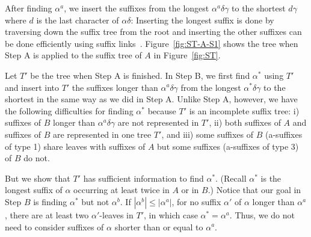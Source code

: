 \documentclass{llncs}
\newcommand{\partitle}[1]{}                        \newcommand{\commentout}[1]{}
\begin{document}
After finding $\alpha^{a}$,
 we insert the suffixes from the longest $\alpha^{a}\delta \gamma$
 to the shortest $d\gamma$ where $d$ is the last character of $\alpha\delta$:
Inserting the longest suffix is done by traversing down the suffix tree from the root
 and inserting the other suffixes can be done efficiently
 using suffix links~\cite{McCreight:76,Ukkonen:95}.
Figure~\ref{fig:ST-A-S1} shows the tree when Step A is applied to
the suffix tree of $A$ in Figure~\ref{fig:ST}.



\partitle{Step B}

Let $T'$ be the tree when Step A is finished.
In Step B, we first find $\alpha^{*}$ using $T'$
 and insert into $T'$ the suffixes longer than $\alpha^{a}\delta\gamma$
 from the longest $\alpha^{*}\delta \gamma$ to the shortest
 in the same way as we did in Step A.
Unlike Step A, however,
 we have the following difficulties for finding $\alpha^{*}$
 because $T'$ is an incomplete suffix tree:
 i) suffixes of $B$ longer than $\alpha^{a}\delta\gamma$ are not represented in $T'$,
 ii) both suffixes of $A$ and suffixes of $B$ are represented in one tree $T'$, and
 iii) some suffixes of $B$ (a-suffixes of type 1)
     share leaves with suffixes of $A$
     but some suffixes (a-suffixes of type 3) of $B$ do not.


But we show that $T'$ has sufficient information to find $\alpha^{*}$.
(Recall $\alpha^{*}$ is the longest suffix of $\alpha$
 occurring at least twice in $A$ or in $B$.)
Notice that our goal in Step $B$ is finding $\alpha^{*}$ but not $\alpha^{b}$.
If $|\alpha^{b}| \le |\alpha^{a}|$,
 for no suffix $\alpha'$ of $\alpha$ longer than $\alpha^{a}$,
 there are at least two $\alpha'$-leaves in $T'$,
 in which case $\alpha^{*}=\alpha^{a}$.
Thus, we do not need to consider suffixes of $\alpha$ shorter than or equal to $\alpha^{a}$.
\end{document}

